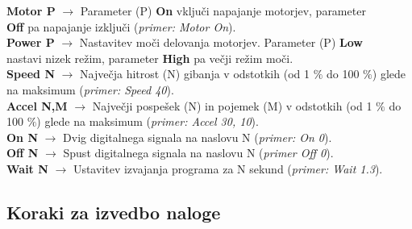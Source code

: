 \textbf{Motor P} $\longrightarrow$ Parameter (P) \textbf{On} vključi napajanje motorjev, parameter \\ %
\hspace*{2.1cm} \textbf{Off} pa napajanje izključi (\emph{primer: Motor On}). \vspace{-0.3cm} \\ %

\textbf{Power P} $\longrightarrow$ Nastavitev moči delovanja motorjev. Parameter (P) \textbf{Low} \\ %
\hspace*{2.1cm} nastavi nizek režim, parameter \textbf{High} pa večji režim moči.  \vspace{-0.3cm} \\ %

\textbf{Speed N} $\longrightarrow$ Največja hitrost (N) gibanja v odstotkih (od 1 $\%$ do 100 $\%$) glede \\ %
\hspace*{2.1cm}   na maksimum (\emph{primer: Speed 40}). \vspace{-0.3cm} \\ %

\textbf{Accel N,M} $\longrightarrow$ Največji pospešek (N) in pojemek (M) v odstotkih (od 1 $\%$ do\\ %
\hspace*{2.4cm} 100 $\%$) glede na maksimum (\emph{primer: Accel 30, 10}). \vspace{-0.3cm} \\ %

\textbf{On N} $\longrightarrow$ Dvig digitalnega signala na naslovu N (\emph{primer: On 0}). \vspace{-0.3cm} \\ %

\textbf{Off N} $\longrightarrow$ Spust digitalnega signala na naslovu N (\emph{primer Off 0}). \vspace{-0.3cm} \\ %

\textbf{Wait N} $\longrightarrow$ Ustavitev izvajanja programa za N sekund (\emph{primer: Wait 1.3}). \vspace{-0.3cm} \\ %


\subsection{Koraki za izvedbo naloge}
\vspace{0.3cm}

